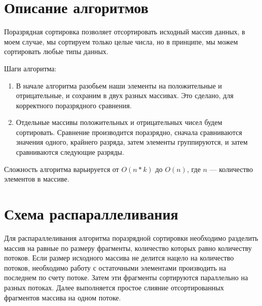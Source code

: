 \documentclass{report}
\begin{document}
\section*{Описание алгоритмов}
Поразрядная сортировка позволяет отсортировать исходный массив данных, в моем случае, мы сортируем только целые числа, но в принципе, мы можем сортировать любые типы данных. 
\par Шаги алгоритма:
\begin{enumerate}
\item В начале алгоритма разобьем наши элементы на положительные и отрицательные, и сохраним в двух разных массивах. Это сделано, для корректного поразрядного сравнения.
\item Отдельные массивы положительных и отрицательных чисел будем сортировать. Сравнение производится поразрядно, сначала сравниваются значения одного, крайнего разряда, затем элементы группируются, и затем сравниваются следующие разряды.
\end{enumerate}
\par Сложность алгоритма варьируется от $ O(n*k)$ до $O(n)$, где $n$ --- количество элементов в массиве.

\newpage

\section*{Схема распараллеливания}
Для распараллеливания алгоритма поразрядной сортировки необходимо разделить массив на равные по размеру фрагменты, количество которых равно количеству потоков. Если размер исходного массива не делится нацело на количество потоков, необходимо работу с остаточными элементами производить на последнем по счету потоке. Затем эти фрагменты сортируются параллельно на разных потоках. Далее выполняется простое слияние отсортированных фрагментов массива на одном потоке.

\newpage

\end{document}
